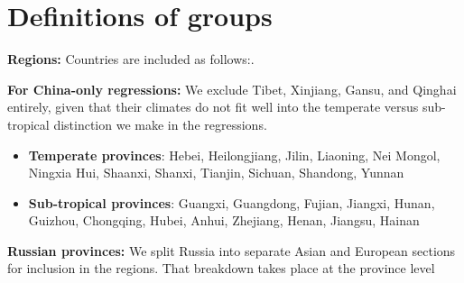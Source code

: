 \documentclass[11pt]{article}
\begin{document}
\section{Definitions of groups}

\noindent\textbf{Regions:} Countries are included as follows:. 
\begin{itemize}
    \setlength\itemsep{0pt}
    
\end{itemize}

\noindent\textbf{For China-only regressions:} We exclude Tibet, Xinjiang, Gansu, and Qinghai entirely, given that their climates do not fit well into the temperate versus sub-tropical distinction we make in the regressions.
\begin{itemize}
	\setlength\itemsep{0pt}
	\item \textbf{Temperate provinces}: Hebei, Heilongjiang, Jilin, Liaoning, Nei Mongol, Ningxia Hui, Shaanxi, Shanxi, Tianjin, Sichuan, Shandong, Yunnan
	\item \textbf{Sub-tropical provinces}: Guangxi, Guangdong, Fujian, Jiangxi, Hunan, Guizhou, Chongqing, Hubei, Anhui, Zhejiang, Henan, Jiangsu, Hainan
\end{itemize}

\noindent\textbf{Russian provinces:} We split Russia into separate Asian and European sections for inclusion in the regions. That breakdown takes place at the province level
\begin{itemize}
    \setlength\itemsep{0pt}
    
\end{itemize}

\clearpage

\onehalfspacing
{\small


}

\clearpage
\end{document}
